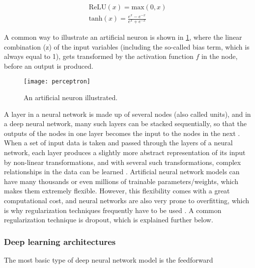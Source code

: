 \begin{gather}
    \text{ReLU}(x) = \text{max}(0,x) \label{eq:relu} \\[1ex]
    \text{tanh}(x) = \frac{e^x - e^{-x}}{e^x + e^{-x}} \label{eq:tanh}
\end{gather}

A common way to illustrate an artificial neuron is shown in \cref{fig:perceptron}, where the linear combination (z) of the input variables (including the so-called bias term, which is always equal to 1), gets transformed by the activation function $f$ in the node, before an output is produced.
\begin{figure}[h]
\begin{center}
\texttt{[image: perceptron]}
\caption{An artificial neuron illustrated.}
\label{fig:perceptron}
\end{center}
\end{figure}
A layer in a neural network is made up of several nodes (also called units), and in a deep neural network, many such layers can be stacked sequentially, so that the outputs of the nodes in one layer becomes the input to the nodes in the next \cite{smlbook}. When a set of input data is taken and passed through the layers of a neural network, each layer produces a slightly more abstract representation of its input by non-linear transformations, and with several such transformations, complex relationships in the data can be learned \cite{LeCun2015, smlbook}. Artificial neural network models can have many thousands or even millions of trainable parameters/weights, which makes them extremely flexible. However, this flexibility comes with a great computational cost, and neural networks are also very prone to overfitting, which is why regularization techniques frequently have to be used \cite{smlbook}. A common regularization technique is dropout, which is explained further below. 

\subsubsection{Deep learning architectures}
The most basic type of deep neural network model is the feedforward 



